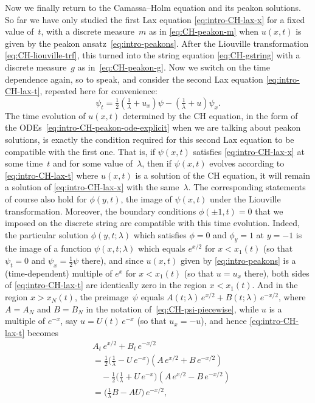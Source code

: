 \documentclass[10pt,a4paper]{article} \pdfoutput=1 
\begin{document}
Now we finally return to the Camassa--Holm equation and its peakon solutions.
So far we have only studied the first Lax equation \eqref{eq:intro-CH-lax-x}
for a fixed value of~$t$,
with a discrete measure~$m$ as in \eqref{eq:CH-peakon-m}
when $u(x,t)$ is given by the peakon ansatz~\eqref{eq:intro-peakons}.
After the Liouville transformation \eqref{eq:CH-liouville-trf},
this turned into the string equation \eqref{eq:CH-gstring}
with a discrete measure~$g$ as in~\eqref{eq:CH-peakon-g}.
Now we switch on the time dependence again, so to speak,
and consider the second Lax equation \eqref{eq:intro-CH-lax-t},
repeated here for convenience:
\begin{equation*}
  \psi_t = \tfrac12  \left( \tfrac{1}{\lambda} + u_x \right) \psi - \left( \tfrac{1}{\lambda} + u \right) \psi_x
  .
\end{equation*}
The time evolution of $u(x,t)$ determined by the CH equation,
in the form of the ODEs~\eqref{eq:intro-CH-peakon-ode-explicit}
when we are talking about peakon solutions,
is exactly the condition required for this second Lax equation to be compatible with the first one.
That is, if $\psi(x,t)$ satisfies \eqref{eq:intro-CH-lax-x} at some time~$t$
and for some value of~$\lambda$,
then if $\psi(x,t)$ evolves according to \eqref{eq:intro-CH-lax-t} where $u(x,t)$ is a solution
of the CH equation,
it will remain a solution of \eqref{eq:intro-CH-lax-x} with the same~$\lambda$.
The corresponding statements of course also hold for $\phi(y,t)$, the image of $\psi(x,t)$
under the Liouville transformation.
Moreover, the boundary conditions $\phi(\pm 1,t)=0$ that we imposed on the discrete string
are compatible with this time evolution.
Indeed, the particular solution $\phi(y,t;\lambda)$ which satisfies $\phi=0$ and $\phi_y=1$ at $y=-1$
is the image of a function $\psi(x,t;\lambda)$ which equals $e^{x/2}$ for $x < x_1(t)$ (so that
$\psi_t =0$ and $\psi_x = \tfrac12 \psi$ there),
and since $u(x,t)$ given by \eqref{eq:intro-peakons}
is a (time-dependent) multiple of $e^x$ for $x < x_1(t)$ (so that $u=u_x$ there),
both sides of \eqref{eq:intro-CH-lax-t} are identically zero in the region $x < x_1(t)$.
And in the region $x > x_N(t)$, the preimage~$\psi$ equals $A(t;\lambda) \, e^{x/2} + B(t;\lambda) \, e^{-x/2}$,
where $A=A_N$ and $B=B_N$ in the notation of~\eqref{eq:CH-psi-piecewise},
while $u$ is a multiple of $e^{-x}$, say $u=U(t) \, e^{-x}$ (so that $u_x = -u$),
and hence \eqref{eq:intro-CH-lax-t} becomes
\begin{equation}
  \label{eq:CH-time-dependence-A-B}
  \begin{split}
    &
    A_t \, e^{x/2} + B_t \, e^{-x/2}
    \\ &
    = \tfrac12  \bigl( \tfrac{1}{\lambda} - U \, e^{-x} \bigr) (A \, e^{x/2} + B \, e^{-x/2})
    \\ & \quad
    -  \tfrac12 \bigl( \tfrac{1}{\lambda} + U \, e^{-x} \bigr) (A \, e^{x/2} - B \, e^{-x/2})
    \\ &
    = \bigl( \tfrac{1}{\lambda} B - AU \bigr) \, e^{-x/2}
    ,
  \end{split}
\end{equation}
\end{document}
